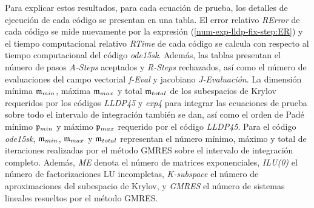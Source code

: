 Para explicar estos resultados, para cada ecuación de prueba, los detalles de ejecución de cada código se presentan en una tabla. El error relativo \textit{RError} de cada código se mide nuevamente por la expresión (\ref{num-exp-lldp-fix-step:ER}) y el tiempo computacional relativo \textit{RTime} de cada código se calcula con respecto al tiempo computacional del código \emph{ode15sk}. Además, las tablas presentan el número de pasos \textit{A-Steps} aceptados y \textit{R-Steps} rechazados, así como el número de evaluaciones del campo vectorial \textit{f-Eval} y jacobiano \textit{J-Evaluación}. La dimensión mínima $\mathfrak{m}_ {min}$, máxima $\mathfrak{m}_ {max}$ y total $\mathfrak{m}_{total}$ de los subespacios de Krylov requeridos por los códigos \emph{LLDP45} y \emph{exp4} para integrar las ecuaciones de prueba sobre todo el intervalo de integración  también se dan, así como el orden de Padé mínimo $\mathfrak{p}_{min}$ y máximo $\mathfrak{p}_{max}$ requerido por el código \emph{LLDP45}. Para el código \emph{ode15sk}, $\mathfrak{m}_{min}$, $\mathfrak{m}_{max}$ y $\mathfrak{m}_{total}$ representan el número mínimo, máximo y total de iteraciones realizadas por el método GMRES sobre el intervalo de integración completo. Además, \textit{ME} denota el número de matrices exponenciales, \textit{ILU(0)} el número de factorizaciones LU incompletas, \textit{K-subspace} el número de aproximaciones del subespacio de Krylov, y \textit{GMRES} el número de sistemas lineales resueltos por el método GMRES.

